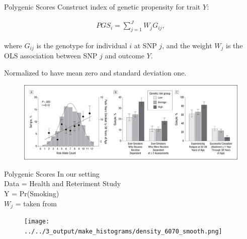 \documentclass[10pt,compress,xcolor=dvipsnames]{beamer}    %
\newcounter{ex}
\newcommand{\1}[1]{\mathrm{1\hspace*{-2.5pt}l}[#1]}	%
\begin{document}

\begin{frame}{Polygenic Scores}
Construct index of genetic propensity for trait $Y$:

\begin{align}
PGS_i = \sum_{j=1}^{J} W_j G_{ij},
\end{align}

where $G_{ij}$ is the genotype for individual $i$ at SNP $j$, and the weight $W_j$ is the OLS association between SNP $j$ and outcome $Y$.

Normalized to have mean zero and standard deviation one.

\begin{figure}[hbtp]
\centering
\includegraphics[height=0.3\textheight]{Belsky2013smokingPGS}
\end{figure}

\cite{Belsky2013smoke}

\end{frame}


\begin{frame}{Polygenic Scores}
In our setting \\
Data = Health and Reteriment Study \\
Y = Pr(Smoking) \\
$W_j$ = taken from \cite{GSCAN2019gwas}

\begin{figure}[hbtp]
\centering
\texttt{[image: ../../3\_output/make\_histograms/density\_6070\_smooth.png]}
\end{figure}

\end{frame}
\end{document}
